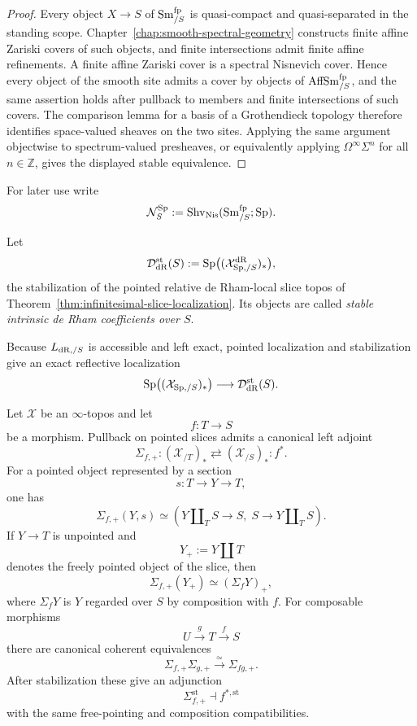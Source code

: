 \begin{proof}
Every object $X\to S$ of $\operatorname{Sm}^{\mathrm{fp}}_{/S}$ is quasi-compact and
quasi-separated in the standing scope.  Chapter~\ref{chap:smooth-spectral-geometry}
constructs finite affine Zariski covers of such objects, and finite
intersections admit finite affine refinements.  A finite affine Zariski cover
is a spectral Nisnevich cover.  Hence every object of the smooth site admits a
cover by objects of $\operatorname{AffSm}^{\mathrm{fp}}_{/S}$, and the same assertion
holds after pullback to members and finite intersections of such covers.  The
comparison lemma for a basis of a Grothendieck topology therefore identifies
space-valued sheaves on the two sites.  Applying the same argument objectwise
to spectrum-valued presheaves, or equivalently applying
$\Omega^\infty\Sigma^n$ for all $n\in\mathbb Z$, gives the displayed stable
equivalence.
\end{proof}

For later use write
\[
    \mathcal N_S^{\mathrm{Sp}}
    :=
    \operatorname{Shv}_{\mathrm{Nis}}
    (\operatorname{Sm}^{\mathrm{fp}}_{/S};\mathrm{Sp}).
\]

\begin{definition}
\label{def:infinitesimal-stable-dr-coefficients}
Let
\[
    \mathcal D_{\mathrm{dR}}^{\mathrm{st}}(S)
    :=
    \operatorname{Sp}
    \bigl((\mathcal X_{\mathrm{Sp},/S}^{\mathrm{dR}})_*\bigr),
\]
the stabilization of the pointed relative de Rham-local slice topos of
Theorem~\ref{thm:infinitesimal-slice-localization}.  Its objects are called
\emph{stable intrinsic de Rham coefficients over $S$}.
\end{definition}

Because $L_{\mathrm{dR},/S}$ is accessible and left exact, pointed localization and
stabilization give an exact reflective localization
\[
    \operatorname{Sp}\bigl((\mathcal X_{\mathrm{Sp},/S})_*\bigr)
    \longrightarrow
    \mathcal D_{\mathrm{dR}}^{\mathrm{st}}(S).
\]

\begin{lemma}
\label{lem:infinitesimal-pointed-dependent-sum}
Let $\mathcal X$ be an $\infty$-topos and let
\[
    f:T\longrightarrow S
\]
be a morphism.  Pullback on pointed slices admits a canonical left adjoint
\[
    \Sigma_{f,+}:
    (\mathcal X_{/T})_*
    \rightleftarrows
    (\mathcal X_{/S})_*:
    f^*.
\]
For a pointed object represented by a section
\[
    s:T\longrightarrow Y\longrightarrow T,
\]
one has
\[
    \boxed{
    \Sigma_{f,+}(Y,s)
    \simeq
    \left(
      Y\amalg_T S\longrightarrow S,\;
      S\longrightarrow Y\amalg_T S
    \right).
    }
\]
If $Y\to T$ is unpointed and
\[
    Y_+:=Y\amalg T
\]
denotes the freely pointed object of the slice, then
\[
    \boxed{
    \Sigma_{f,+}(Y_+)
    \simeq
    (\Sigma_fY)_+,
    }
\]
where $\Sigma_fY$ is $Y$ regarded over $S$ by composition with $f$.
For composable morphisms
\[
    U\xrightarrow{g}T\xrightarrow{f}S
\]
there are canonical coherent equivalences
\[
    \Sigma_{f,+}\Sigma_{g,+}
    \xrightarrow{\simeq}
    \Sigma_{fg,+}.
\]
After stabilization these give an adjunction
\[
    \Sigma_{f,+}^{\mathrm{st}}
    \dashv
    f^{*,\mathrm{st}}
\]
with the same free-pointing and composition compatibilities.
\end{lemma}

